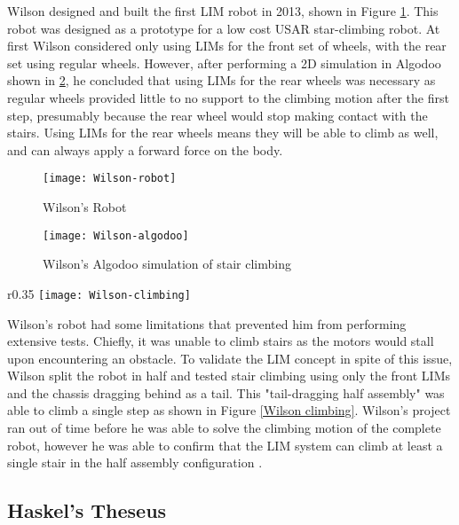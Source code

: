 Wilson designed and built the first LIM robot in 2013, shown in Figure \ref{Wilson robot}. This robot was designed as a prototype for a low cost USAR star-climbing robot. At first Wilson considered only using LIMs for the front set of wheels, with the rear set using regular wheels. However, after performing a 2D simulation in Algodoo shown in \ref{Wilson algodoo}, he concluded that using LIMs for the rear wheels was necessary as regular wheels provided little to no support to the climbing motion after the first step, presumably because the rear wheel would stop making contact with the stairs. Using LIMs for the rear wheels means they will be able to climb as well, and can always apply a forward force on the body.

\begin{figure}[h]
	\centering
	\texttt{[image: Wilson-robot]}
	\caption{Wilson's Robot \citep{Wilson-2013}}
	\label{Wilson robot}
\end{figure}

\begin{figure}[h]
	\centering
	\texttt{[image: Wilson-algodoo]}
	\caption{Wilson's Algodoo simulation of stair climbing \citep{Wilson-2013}}
	\label{Wilson algodoo}
\end{figure}

\begin{wrapfigure}{r}{0.35\textwidth} %
	\centering
	\texttt{[image: Wilson-climbing]}
	\caption{Wilson's half assembly climbing a stair \citep{Wilson-2013}}
	\label{Wilson climbing}
\end{wrapfigure}

Wilson's robot had some limitations that prevented him from performing extensive tests. Chiefly, it was unable to climb stairs as the motors would stall upon encountering an obstacle. To validate the LIM concept in spite of this issue, Wilson split the robot in half and tested stair climbing using only the front LIMs and the chassis dragging behind as a tail. This "tail-dragging half assembly" was able to climb a single step as shown in Figure \ref{Wilson climbing}. Wilson's project ran out of time before he was able to solve the climbing motion of the complete robot, however he was able to confirm that the LIM system can climb at least a single stair in the half assembly configuration \citep{Wilson-2013}.

\subsection{Haskel's Theseus} %

